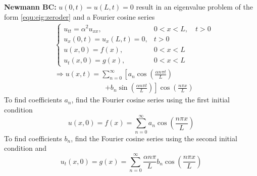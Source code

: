 \documentclass[10pt,leqno]{article}
\begin{document}
\begin{multicols}{2}
\textbf{Newmann BC:} $u(0,t) = u(L,t)= 0$ result in an eigenvalue pro\-blem of the form \eqref{equ:eig:zeroder} and a Fourier cosine series
\begin{align}
    & \left\{ \begin{array}{ll}
            u_{tt} = \alpha^{2} u_{xx}, & 0<x<L, \quad t>0 \\
            u_{x}(0,t) = u_{x}(L,t)= 0, & t>0 \\
            u(x,0) = f(x), & 0<x<L \\
            u_{t}(x,0) = g(x), & 0<x<L
    \end{array}\right. \label{equ:wave:neumann} \\
    & \Rightarrow u(x,t)= \sum_{n=0}^{\infty}\left[ a_{n}\cos\left( \frac{\alpha n\pi t}{L} \right) \right. \\
    & \hspace{3cm} \left. + b_{n}\sin\left( \frac{\alpha n\pi t}{L} \right) \right] \cos\left(\frac{n\pi x}{L}\right) \nonumber
\end{align}
To find coefficients $a_{n}$, find the Fourier cosine series using the first initial condition
\begin{equation}
    u(x,0)=f(x)=\sum_{n=0}^{\infty} a_{n} \cos \left(\frac{n\pi x}{L}\right)
\end{equation}
To find coefficients $b_{n}$, find the Fourier cosine series using the second initial condition and 
\begin{equation}
    u_{t}(x,0)=g(x)=\sum_{n=0}^{\infty} \frac{\alpha n\pi}{L} b_{n} \cos \left(\frac{n\pi x}{L}\right)
\end{equation}

\end{multicols}
\end{document}
